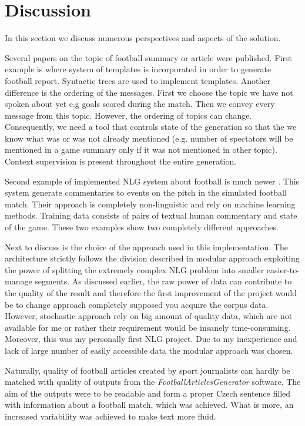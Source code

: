 \section{Discussion}
In this section we discuss numerous perspectives and aspects of the solution.

Several papers on the topic of football summary or article were published. First example is \cite{et1997generation} where system of templates is incorporated in order to generate football report. Syntactic trees are used to implement templates. Another difference is the ordering of the messages. First we choose the topic we have not spoken about yet e.g goals scored during the match. Then we convey every message from this topic. However, the ordering of topics can change. Consequently, we need a tool that controls state of the generation so that the we know what was or was not already mentioned (e.g. number of spectators will be mentioned in a game summary only if it was not mentioned in other topic). Context supervision is present throughout the entire generation.

Second example of implemented NLG system about football is much newer \cite{chen2008learning}. This system generate commentaries to events on the pitch in the simulated football match. Their approach is completely non-linguistic and rely on machine learning methods. Training data consists of pairs of textual human commentary and state of the game. These two examples show two completely different approaches.

Next to discuss is the choice of the approach used in this implementation. The architecture strictly follows the division described in modular approach exploiting the power of splitting the extremely complex NLG problem into smaller easier-to-manage segments. As discussed earlier, the raw power of data can contribute to the quality of the result and therefore the first improvement of the project would be to change approach completely supposed you acquire the corpus data. However, stochastic approach rely on big amount of quality data, which are not available for me or rather their requirement would be insanely time-consuming. Moreover, this was my personally first NLG project. Due to my inexperience and lack of large number of easily accessible data the modular approach was chosen.

Naturally, quality of football articles created by sport journalists can hardly be matched with quality of outputs from the \textit{FootballArticlesGenerator} software. The aim of the outputs were to be readable and form a proper Czech sentence filled with information about a football match, which was achieved. What is more, an increased variability was achieved to make text more fluid.

